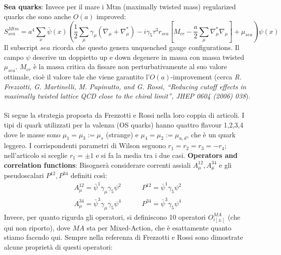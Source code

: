 \documentclass[12pt,a4paper,openright]{article}
\newcommand{\colg}{\textcolor{PineGreen}}
\begin{document}
\noindent
{\bf Sea quarks}:\newline
Invece per il mare i Mtm (maximally twisted mass) regularized quarks che sono anche $O(a)$ improved:
\begin{equation}\label{eqn:Mtm}
  S_{sea}^{Mtm} = a^4 \sum_x \bar \psi(x)\left( \frac{1}{2}\sum_\mu \gamma_\mu (\nabla_\mu + \nabla_\mu ^*) - i \gamma_5 \tau^3 r_{sea} [ M_{cr} - \frac{a}{2}\sum_\mu \nabla_\mu^* \nabla_\mu ] + \mu_{sea} \right) \psi (x) 
\end{equation}
Il subscript $sea$ ricorda che questo genera unquenched gauge configurations.
Il campo $\psi$ descrive un doppietto up e down degenere in massa con massa twisted $\mu_{sea}$.
$M_{cr}$ è la massa critica da fissare non perturbativamente al suo valore ottimale, cioè il valore tale che viene garantito l'$O(a)$-improvement (cerca \textit{R. Frezzotti, G. Martinelli, M. Papinutto, and G. Rossi, “Reducing cutoff effects in maximally twisted lattice QCD close to the chiral limit”, JHEP 0604 (2006) 038}).
\\\\
Si segue la strategia proposta da Frezzotti e Rossi nella loro coppia di articoli.
I tipi di quark utilizzati per la valenza (OS quarks) hanno quattro flavour 1,2,3,4 dove le masse sono $\mu_1 = \mu_3 := \mu_s$ (strange) e $\mu_4 = \mu_2 := \mu_{u,d}$, che è un quark leggero.
I corrispondenti parametri di Wilson seguono $r_1 = r_2 = r_3 = - r_4$; nell'articolo si sceglie $r_1 = \pm 1$ e si fa la media tra i due casi.
\newline
\newline
{\bf Operators and correlation functions}:\newline
Bisognerà considerare correnti assiali $A_\mu^{12}, A_\mu^{34}$ e gli pseudoscalari $P^{12}, P^{34}$ definiti così:
\begin{equation*}
  \begin{aligned}
    & A_\mu^{12} = \bar\psi^1 \gamma_\mu \gamma_5 \psi^2 \qquad \quad P^{12} = \bar\psi^1 \gamma_5 \psi^2&\\
    & A_\mu^{34} = \bar\psi^3 \gamma_\mu \gamma_5 \psi^4 \qquad \quad P^{34} = \bar\psi^3 \gamma_5 \psi^4&
  \end{aligned}
\end{equation*}
\newline
Invece, per quanto rigurda gli operatori, si definiscono \colg{10 operatori} $O_{i[\pm]}^{MA}$ (che qui non riporto), dove $MA$ sta per \colg{Mixed-Action}, che è esattamente quanto stiamo facendo qui.
Sempre nella referenza di Frezzotti e Rossi sono dimostrate alcune proprietà di questi operatori:
\end{document}

